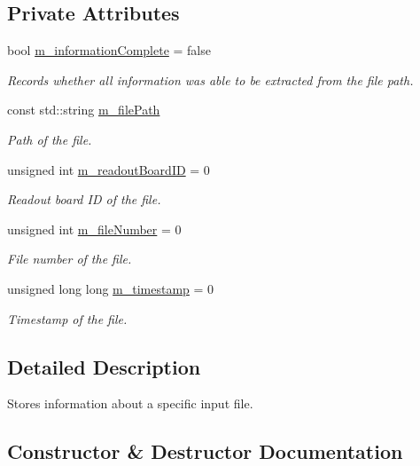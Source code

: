 \subsection*{Private Attributes}
\begin{DoxyCompactItemize}
\item 
bool \hyperlink{class_input_file_ab4724adf6c3da88760dccc42d6b6401d}{m\+\_\+information\+Complete} = false
\begin{DoxyCompactList}\small\item\em Records whether all information was able to be extracted from the file path. \end{DoxyCompactList}\item 
const std\+::string \hyperlink{class_input_file_ae3a763e9997cebb9f50aef29499d53c2}{m\+\_\+file\+Path}
\begin{DoxyCompactList}\small\item\em Path of the file. \end{DoxyCompactList}\item 
unsigned int \hyperlink{class_input_file_a15431dd487c5ac563745856544c9261d}{m\+\_\+readout\+Board\+ID} = 0
\begin{DoxyCompactList}\small\item\em Readout board ID of the file. \end{DoxyCompactList}\item 
unsigned int \hyperlink{class_input_file_af5c90eb7ded9297cc12248935968ee87}{m\+\_\+file\+Number} = 0
\begin{DoxyCompactList}\small\item\em File number of the file. \end{DoxyCompactList}\item 
unsigned long long \hyperlink{class_input_file_a900aea752727f969fa00a8b2727dd4e8}{m\+\_\+timestamp} = 0
\begin{DoxyCompactList}\small\item\em Timestamp of the file. \end{DoxyCompactList}\end{DoxyCompactItemize}


\subsection{Detailed Description}
Stores information about a specific input file. 

\subsection{Constructor \& Destructor Documentation}
\mbox{\label{class_input_file_a36704203477e78e7de3ff4b98276e3a6}} 
